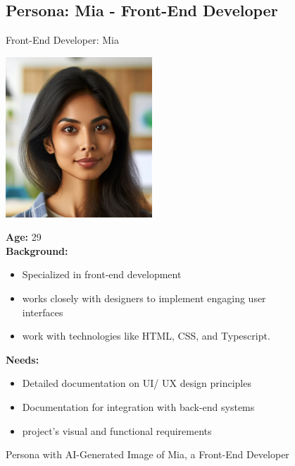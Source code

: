 \pagebreak

\begin{figure}[h!]
\subsection*{Persona: Mia - Front-End Developer}
\begin{persona}{Front-End Developer: Mia}
\begin{tcbraster}[raster columns=2, raster column skip=5mm]
  \begin{tcolorbox}[width=0.2\linewidth, colback=white, colframe=white, boxrule=0pt, halign=center]
   \includegraphics[width=\linewidth, height=6cm, keepaspectratio]{Images/Mia.jpg}
  \end{tcolorbox}
  \begin{tcolorbox}[width=0.8\linewidth, colback=white, colframe=white, boxrule=0pt]
  \fontsize{10pt}{9.6pt}\selectfont
    \textbf{Age:} 29\\
            \textbf{Background:} 
    \begin{itemize}
        \item Specialized in front-end development
        \item works closely with designers to implement engaging user interfaces
        \item work with technologies like HTML, CSS, and Typescript.
    \end{itemize}
    \textbf{Needs:}
        \begin{itemize}
        \item Detailed documentation on \ac{UI}/ \ac{UX} design principles
        \item Documentation for integration with back-end systems
        \item project's visual and functional requirements
    \end{itemize}
  \end{tcolorbox}
\end{tcbraster}
\end{persona}
\caption{Persona with \ac{AI}-Generated Image of Mia, a Front-End Developer}
\label{fig:persona:mia}
\end{figure}


